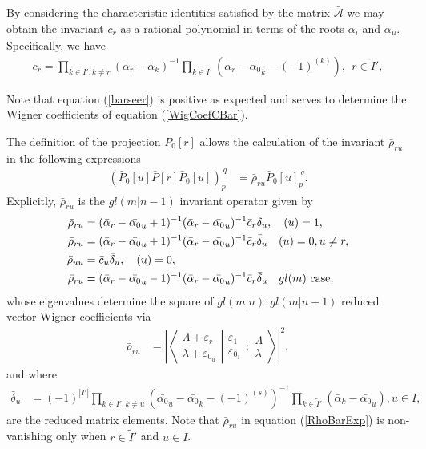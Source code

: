 \documentclass[12pt]{article}
\def\nn{\nonumber}
\begin{document}
By considering the characteristic identities satisfied by the matrix $\bar{\mathcal{A}}$ we may obtain the invariant $\bar{c}_r$ as a rational polynomial in terms of the roots $\bar{\alpha}_i$ and $\bar{\alpha}_\mu$. Specifically, we have \cite{GIW1}
\begin{align}
\bar{c}_r = \prod_{k\in \tilde{I}',k\neq r} \left(\bar{\alpha}_r - \bar{\alpha}_k\right)^{-1}\prod_{k\in
I'} \left(\bar{\alpha}_r - \bar{\alpha_0}_k - (-1)^{(k)}\right),\ \ r\in \tilde{I}',
\label{barseer}
\end{align}

Note that equation (\ref{barseer}) is positive as expected and serves to determine the Wigner coefficients of equation (\ref{WigCoefCBar}).

The definition of the projection $\bar{P_0}[r]$ allows the calculation of the invariant $\bar{\rho}_{ru}$ in the following expressions \cite{GIW2}
\begin{align}
(\bar{P}_0[u]\bar{P}[r]\bar{P}_0[u])_p^{\ q} &= \bar{\rho}_{ru}\bar{P}_0[u]_p^{\ q}.
\end{align}
Explicitly, $\bar{\rho}_{ru}$ is the $gl(m|n-1)$ invariant operator given by
\begin{align}
\bar{\rho}_{ru} &= (\bar{\alpha}_r-\bar{\alpha_0}_u +
1)^{-1}(\bar{\alpha}_r-\bar{\alpha_0}_u)^{-1}\bar{c}_r\bar{\delta}_u, \ \ \ (u) = 1, \nn\\
\bar{\rho}_{ru} &= (\bar{\alpha}_r-\bar{\alpha_0}_u +
1)^{-1}(\bar{\alpha}_r-\bar{\alpha_0}_u)^{-1}\bar{c}_r\bar{\delta}_u \ \ \ (u) = 0, u \neq r,
\nn\\
\bar{\rho}_{uu} &= \bar{c}_u \bar{\delta}_u, \ \ \ (u) = 0, \nn\\
\bar{\rho}_{ru} &= (\bar{\alpha}_r-\bar{\alpha_0}_u -
1)^{-1}(\bar{\alpha}_r-\bar{\alpha_0}_u)^{-1}\bar{c}_r \bar{\delta}_u \ \ \ gl(m)
\hbox{~case,} 
\label{RhoBarExp}
\end{align}
whose eigenvalues determine the square of $gl(m|n):gl(m|n-1)$ reduced vector Wigner
coefficients via
\begin{align}
\bar{\rho}_{ru}  &= \left| \left\langle\left. 
\begin{array}{c} \Lambda+\varepsilon_r\\ \lambda+\varepsilon_{0_u} \end{array}
\right|\right.
\left.
\begin{array}{c} \varepsilon_1 \\
\varepsilon_{0_1} \end{array} 
;
 \begin{array}{c} \Lambda \\
\lambda \end{array}
\right\rangle \right|^2,
\end{align}
and where
\begin{align}
\bar{\delta}_u &= (-1)^{|I'|} \prod_{k\in I',k\neq u}\left(\bar{\alpha_0}_u - \bar{\alpha_0}_k -
(-1)^{(s)}\right)^{-1} \prod_{k\in \tilde{I}'}\left(\bar{\alpha}_k - \bar{\alpha_0}_u \right), u\in I, 
\end{align}
are the reduced matrix elements.
Note that $\bar{\rho}_{ru}$ in equation (\ref{RhoBarExp}) is non-vanishing only when $r\in \tilde{I}'$ and $u\in I$.
\end{document}
